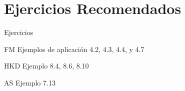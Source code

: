 \documentclass[aspectratio=169, usenames,svgnames,dvipsnames]{beamer}
\begin{document}
\section{Ejercicios Recomendados}
\label{sec:orgb58a2f5}

\begin{frame}[label={sec:org6df53fb}]{Ejercicios}
\begin{block}{FM}
Ejemplos de aplicación 4.2, 4.3, 4.4, y 4.7
\end{block}
\begin{block}{HKD}
Ejemplo 8.4, 8.6, 8.10
\end{block}
\begin{block}{AS}
Ejemplo 7.13
\end{block}
\end{frame}
\end{document}
